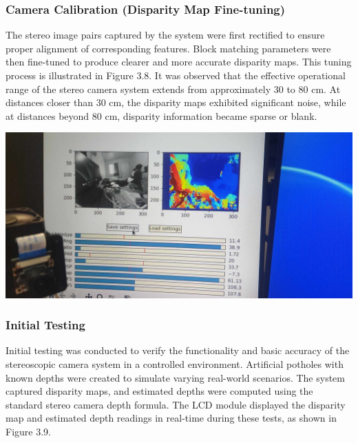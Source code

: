\subsubsection{Camera Calibration (Disparity  Map Fine-tuning)}
The stereo image pairs captured by the system were first rectified to ensure proper alignment of corresponding features. Block matching parameters were then fine-tuned to produce clearer and more accurate disparity maps. This tuning process is illustrated in Figure 3.8. It was observed that the effective operational range of the stereo camera system extends from approximately 30 to 80 cm. At distances closer than 30 cm, the disparity maps exhibited significant noise, while at distances beyond 80 cm, disparity information became sparse or blank.

\begin{center}
	\includegraphics[scale=0.15]{calibration2.jpg}
\end{center}

\subsubsection{Initial Testing}
Initial testing was conducted to verify the functionality and basic accuracy of the stereoscopic camera system in a controlled environment. Artificial potholes with known depths were created to simulate varying real-world scenarios. The system captured disparity maps, and estimated depths were computed using the standard stereo camera depth formula. The LCD module displayed the disparity map and estimated depth readings in real-time during these tests, as shown in Figure 3.9.

